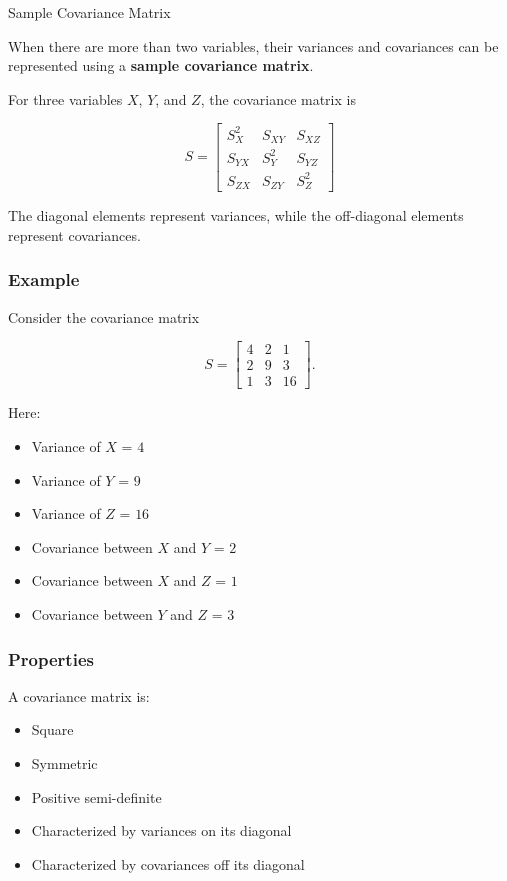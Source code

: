 \documentclass[aspectratio=169]{beamer}
\begin{document}
\begin{frame}{Sample Covariance Matrix}

When there are more than two variables, their variances and covariances
can be represented using a \textbf{sample covariance matrix}.

For three variables $X$, $Y$, and $Z$, the covariance matrix is

\[
\boxed{
S=
\begin{bmatrix}
S_X^2 & S_{XY} & S_{XZ}\\
S_{YX} & S_Y^2 & S_{YZ}\\
S_{ZX} & S_{ZY} & S_Z^2
\end{bmatrix}
}
\]

The diagonal elements represent variances, while the off-diagonal
elements represent covariances.

\subsubsection*{Example}

Consider the covariance matrix

\[
S=
\begin{bmatrix}
4 & 2 & 1\\
2 & 9 & 3\\
1 & 3 & 16
\end{bmatrix}.
\]
\end{frame}
Here:

\begin{itemize}
    \item Variance of $X$ = $4$
    \item Variance of $Y$ = $9$
    \item Variance of $Z$ = $16$
    \item Covariance between $X$ and $Y$ = $2$
    \item Covariance between $X$ and $Z$ = $1$
    \item Covariance between $Y$ and $Z$ = $3$
\end{itemize}

\subsubsection*{Properties}

A covariance matrix is:

\begin{itemize}
    \item Square
    \item Symmetric
    \item Positive semi-definite
    \item Characterized by variances on its diagonal
    \item Characterized by covariances off its diagonal
\end{itemize}
\end{document}
